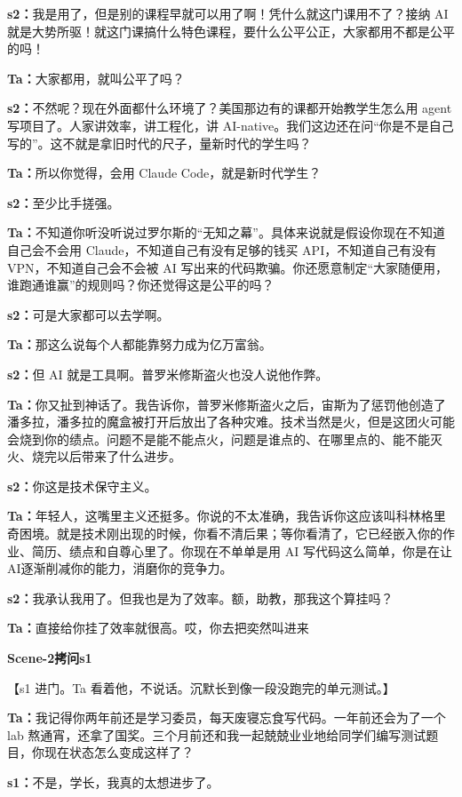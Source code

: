 \documentclass[12pt]{article}
\newcommand{\scene}[2]{%
  \clearpage
  {\Large\bfseries #1\quad #2}\par
  \vspace{0.6em}
}
\newcommand{\dialogue}[2]{%
  \textbf{#1：}#2\par
}
\newcommand{\stage}[1]{%
  {\sffamily\color{gray}#1}\par
}
\begin{document}
\dialogue{s2}{我是用了，但是别的课程早就可以用了啊！凭什么就这门课用不了？接纳 AI 就是大势所驱！就这门课搞什么特色课程，要什么公平公正，大家都用不都是公平的吗！}

\dialogue{Ta}{大家都用，就叫公平了吗？}

\dialogue{s2}{不然呢？现在外面都什么环境了？美国那边有的课都开始教学生怎么用 agent 写项目了。人家讲效率，讲工程化，讲 AI-native。我们这边还在问“你是不是自己写的”。这不就是拿旧时代的尺子，量新时代的学生吗？}

\dialogue{Ta}{所以你觉得，会用 Claude Code，就是新时代学生？}

\dialogue{s2}{至少比手搓强。}

\dialogue{Ta}{不知道你听没听说过罗尔斯的“无知之幕”。具体来说就是假设你现在不知道自己会不会用 Claude，不知道自己有没有足够的钱买 API，不知道自己有没有VPN，不知道自己会不会被 AI 写出来的代码欺骗。你还愿意制定“大家随便用，谁跑通谁赢”的规则吗？你还觉得这是公平的吗？}

\dialogue{s2}{可是大家都可以去学啊。}

\dialogue{Ta}{那这么说每个人都能靠努力成为亿万富翁。}

\dialogue{s2}{但 AI 就是工具啊。普罗米修斯盗火也没人说他作弊。}

\dialogue{Ta}{你又扯到神话了。我告诉你，普罗米修斯盗火之后，宙斯为了惩罚他创造了潘多拉，潘多拉的魔盒被打开后放出了各种灾难。技术当然是火，但是这团火可能会烧到你的绩点。问题不是能不能点火，问题是谁点的、在哪里点的、能不能灭火、烧完以后带来了什么进步。}

\dialogue{s2}{你这是技术保守主义。}

\dialogue{Ta}{年轻人，这嘴里主义还挺多。你说的不太准确，我告诉你这应该叫科林格里奇困境。就是技术刚出现的时候，你看不清后果；等你看清了，它已经嵌入你的作业、简历、绩点和自尊心里了。你现在不单单是用 AI 写代码这么简单，你是在让AI逐渐削减你的能力，消磨你的竞争力。}

\dialogue{s2}{我承认我用了。但我也是为了效率。额，助教，那我这个算挂吗？}

\dialogue{Ta}{直接给你挂了效率就很高。哎，你去把奕然叫进来}

\scene{Scene-2}{拷问s1}

\stage{【s1 进门。Ta 看着他，不说话。沉默长到像一段没跑完的单元测试。】}

\dialogue{Ta}{我记得你两年前还是学习委员，每天废寝忘食写代码。一年前还会为了一个 lab 熬通宵，还拿了国奖。三个月前还和我一起兢兢业业地给同学们编写测试题目，你现在状态怎么变成这样了？}

\dialogue{s1}{不是，学长，我真的太想进步了。}
\end{document}
